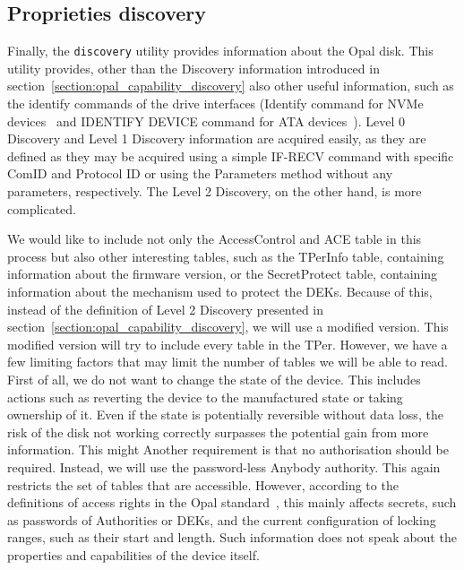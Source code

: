 \subsection{Proprieties discovery}

Finally, the \verb|discovery| utility provides information about the Opal disk. 
This utility provides, other than the Discovery information introduced in section~\ref{section:opal_capability_discovery} also other useful information, such as the identify commands of the drive interfaces (Identify command for NVMe devices~\cite{nvme-express-base-specification} and IDENTIFY DEVICE command for ATA devices~\cite{acs-3}).
Level 0 Discovery and Level 1 Discovery information are acquired easily, as they are defined as they may be acquired using a simple IF-RECV command with specific ComID and Protocol ID or using the Parameters method without any parameters, respectively.
The Level 2 Discovery, on the other hand, is more complicated.

We would like to include not only the AccessControl and ACE table in this process but also other interesting tables, such as the TPerInfo table, containing information about the firmware version, or the SecretProtect table, containing information about the mechanism used to protect the DEKs. 
Because of this, instead of the definition of Level 2 Discovery presented in section~\ref{section:opal_capability_discovery}, we will use a modified version.
This modified version will try to include every table in the TPer.
However, we have a few limiting factors that may limit the number of tables we will be able to read.
First of all, we do not want to change the state of the device. This includes actions such as reverting the device to the manufactured state or taking ownership of it. Even if the state is potentially reversible without data loss, the risk of the disk not working correctly surpasses the potential gain from more information. This might 
Another requirement is that no authorisation should be required. Instead, we will use the password-less Anybody authority. This again restricts the set of tables that are accessible. However, according to the definitions of access rights in the Opal standard~\cite{tcg-opal2}, this mainly affects secrets, such as passwords of Authorities or DEKs, and the current configuration of locking ranges, such as their start and length. Such information does not speak about the properties and capabilities of the device itself.

